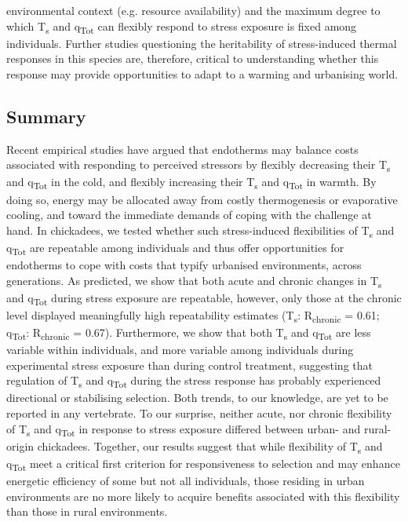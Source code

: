 \documentclass[12pt]{article}
\begin{document}
environmental context (e.g. resource availability) and the maximum degree to which T\textsubscript{s} and q\textsubscript{Tot} can flexibly respond to stress exposure is fixed among individuals. Further studies questioning the heritability of stress-induced thermal responses in this species are, therefore, critical to understanding whether this response may provide opportunities to adapt to a warming and urbanising world.\vspace{0.5cm}

\subsection{Summary}
\vspace{0.5cm}

\noindent Recent empirical studies have argued that endotherms may balance costs associated with responding to perceived stressors by flexibly decreasing their T\textsubscript{s} and q\textsubscript{Tot} in the cold, and flexibly increasing their T\textsubscript{s} and q\textsubscript{Tot} in warmth. By doing so, energy may be allocated away from costly thermogenesis or evaporative cooling, and toward the immediate demands of coping with the challenge at hand. In chickadees, we tested whether such stress-induced flexibilities of T\textsubscript{s} and q\textsubscript{Tot} are repeatable among individuals and thus offer opportunities for endotherms to cope with costs that typify urbanised environments, across generations. As predicted, we show that both acute and chronic changes in T\textsubscript{s} and q\textsubscript{Tot} during stress exposure are repeatable, however, only those at the chronic level displayed meaningfully high repeatability estimates (T\textsubscript{s}: R\textsubscript{chronic} = 0.61; q\textsubscript{Tot}: R\textsubscript{chronic} = 0.67). Furthermore, we show that both T\textsubscript{s} and q\textsubscript{Tot} are less variable within individuals, and more variable among individuals during experimental stress exposure than during control treatment, suggesting that regulation of T\textsubscript{s} and q\textsubscript{Tot} during the stress response has probably experienced directional or stabilising selection. Both trends, to our knowledge, are yet to be reported in any vertebrate. To our surprise, neither acute, nor chronic flexibility of T\textsubscript{s} and q\textsubscript{Tot} in response to stress exposure differed between urban- and rural-origin chickadees. Together, our results suggest that while flexibility of T\textsubscript{s} and q\textsubscript{Tot} meet a critical first criterion for responsiveness to selection and may enhance energetic efficiency of some but not all individuals, those residing in urban environments are no more likely to acquire benefits associated with this flexibility than those in rural environments.
\end{document}
